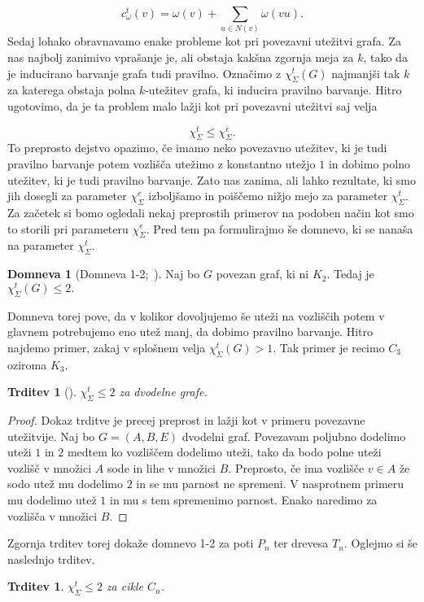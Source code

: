 \documentclass[12pt,a4paper,twoside]{article}
\theoremstyle{definition} %
\newtheorem{domneva}[definicija]{Domneva}
\theoremstyle{plain} %
\newtheorem{trditev}[definicija]{Trditev}
\newcommand{\ec}{\chi_{\Sigma}^e}
\newcommand{\ect}{\chi_{\Sigma}^t}
\numberwithin{equation}{section}  %
\begin{document}
$$c_{\omega}^t(v)  = \omega(v) +  \sum_{u \in N(v)} \omega(vu).$$
Sedaj lohako obravnavamo enake probleme kot pri povezavni utežitvi grafa. Za nas najbolj zanimivo vprašanje je, ali obstaja kakšna zgornja meja za $k$, tako da je inducirano barvanje grafa tudi pravilno. Označimo z $\ect(G)$ najmanjši tak $k$ za katerega obstaja polna $k$-utežitev grafa, ki inducira pravilno barvanje. Hitro ugotovimo, da je ta problem malo lažji kot pri povezavni utežitvi saj velja

$$ \ect \le \ec. $$
To preprosto dejstvo opazimo, če imamo neko povezavno utežitev, ki je tudi pravilno barvanje potem vozlišča utežimo z konstantno utežjo $1$ in dobimo polno utežitev, ki je tudi pravilno barvanje. Zato nas zanima, ali lahko rezultate, ki smo jih dosegli za parameter $\ec$ izboljšamo in poiščemo nižjo mejo za parameter $\ect$.
Za začetek si bomo ogledali nekaj preprostih primerov na podoben način kot smo to storili pri parameteru $\ec$. Pred tem pa formulirajmo še domnevo, ki se nanaša na parameter $\ect$.
\begin{domneva} [Domneva 1-2;~\citet{12conj}]
	\label{12conjecture}
	Naj bo $G$ povezan graf, ki ni $K_2$. Tedaj je $\ect(G) \le 2.$ 
\end{domneva}
Domneva torej pove, da v kolikor dovoljujemo še uteži na vozliščih potem v glavnem potrebujemo eno utež manj, da dobimo pravilno barvanje. Hitro najdemo primer, zakaj v splošnem velja $\ect(G) > 1$. Tak primer je recimo $C_3$ oziroma $K_3$.
\begin{trditev}[\citet{12conj}]
$\ect \le 2$ za dvodelne grafe.
\end{trditev}
\begin{proof}
Dokaz trditve je precej preprost in lažji kot v primeru povezavne utežitvije. Naj bo $G = (A,B, E)$ dvodelni graf. Povezavam  poljubno dodelimo uteži $1$ in $2$ medtem ko vozliščem dodelimo uteži, tako da bodo polne uteži vozlišč v množici $A$ sode in lihe v množici $B$. Preprosto, če ima vozlišče $v \in A$ že sodo utež mu dodelimo $2$ in se mu parnost ne spremeni. V nasprotnem primeru mu dodelimo utež $1$ in mu s tem spremenimo parnost. Enako naredimo za vozlišča v množici $B$.
\end{proof}
Zgornja trditev torej dokaže domnevo 1-2 za poti $P_n$ ter drevesa $T_n$. Oglejmo si še naslednjo trditev.
\begin{trditev}
$\ect \le 2$ za cikle $C_n$.
\end{trditev}
\end{document}
